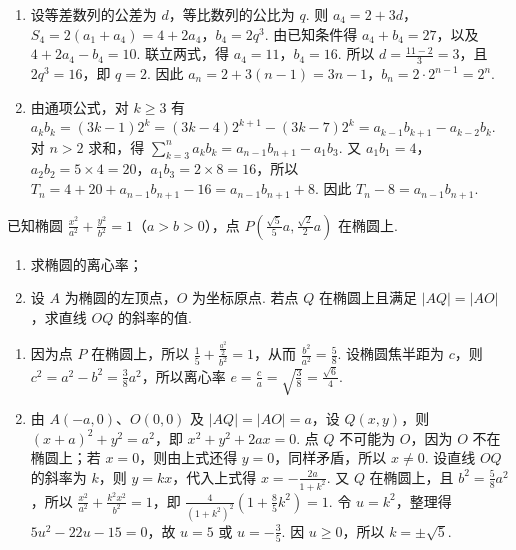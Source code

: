 \begin{solution}
\begin{enumerate}
\item 设等差数列的公差为 \(d\)，等比数列的公比为 \(q\). 则 \(a_4=2+3d\)，\(S_4=2(a_1+a_4)=4+2a_4\)，\(b_4=2q^3\). 由已知条件得 \(a_4+b_4=27\)，以及 \(4+2a_4-b_4=10\). 联立两式，得 \(a_4=11\)，\(b_4=16\). 所以 \(d=\frac{11-2}{3}=3\)，且 \(2q^3=16\)，即 \(q=2\). 因此 \(a_n=2+3(n-1)=3n-1\)，\(b_n=2\cdot2^{n-1}=2^n\).
\item 由通项公式，对 \(k\geqslant3\) 有
\(a_kb_k=(3k-1)2^k=(3k-4)2^{k+1}-(3k-7)2^k=a_{k-1}b_{k+1}-a_{k-2}b_k\).
对 \(n>2\) 求和，得
\(\displaystyle\sum_{k=3}^{n}a_kb_k=a_{n-1}b_{n+1}-a_1b_3\).
又 \(a_1b_1=4\)，\(a_2b_2=5\times4=20\)，\(a_1b_3=2\times8=16\)，所以
\(T_n=4+20+a_{n-1}b_{n+1}-16=a_{n-1}b_{n+1}+8\).
因此 \(T_n-8=a_{n-1}b_{n+1}\).
\end{enumerate}
\end{solution}

\begin{problem}
已知椭圆 \(\frac{x^2}{a^2} + \frac{y^2}{b^2} = 1\)（\(a > b > 0\)），点 \(P\left(\frac{\sqrt{5}}{5}a, \frac{\sqrt{2}}{2}a\right)\) 在椭圆上.
\begin{enumerate}
\item 求椭圆的离心率；
\item 设 \(A\) 为椭圆的左顶点，\(O\) 为坐标原点. 若点 \(Q\) 在椭圆上且满足 \(|AQ| = |AO|\)，求直线 \(OQ\) 的斜率的值.
\end{enumerate}
\end{problem}

\begin{solution}
\begin{enumerate}
\item 因为点 \(P\) 在椭圆上，所以 \(\frac{1}{5}+\frac{\frac{a^2}{2}}{b^2}=1\)，从而 \(\frac{b^2}{a^2}=\frac58\). 设椭圆焦半距为 \(c\)，则 \(c^2=a^2-b^2=\frac38a^2\)，所以离心率 \(e=\frac{c}{a}=\sqrt{\frac38}=\frac{\sqrt6}{4}\).
\item 由 \(A(-a,0)\)、\(O(0,0)\) 及 \(\lvert AQ\rvert=\lvert AO\rvert=a\)，设 \(Q(x,y)\)，则 \((x+a)^2+y^2=a^2\)，即 \(x^2+y^2+2ax=0\). 点 \(Q\) 不可能为 \(O\)，因为 \(O\) 不在椭圆上；若 \(x=0\)，则由上式还得 \(y=0\)，同样矛盾，所以 \(x\ne0\). 设直线 \(OQ\) 的斜率为 \(k\)，则 \(y=kx\)，代入上式得 \(x=-\frac{2a}{1+k^2}\). 又 \(Q\) 在椭圆上，且 \(b^2=\frac58a^2\)，所以 \(\frac{x^2}{a^2}+\frac{k^2x^2}{b^2}=1\)，即 \(\frac{4}{(1+k^2)^2}\left(1+\frac85k^2\right)=1\). 令 \(u=k^2\)，整理得 \(5u^2-22u-15=0\)，故 \(u=5\) 或 \(u=-\frac35\). 因 \(u\geqslant0\)，所以 \(k=\pm\sqrt5\).
\end{enumerate}
\end{solution}

